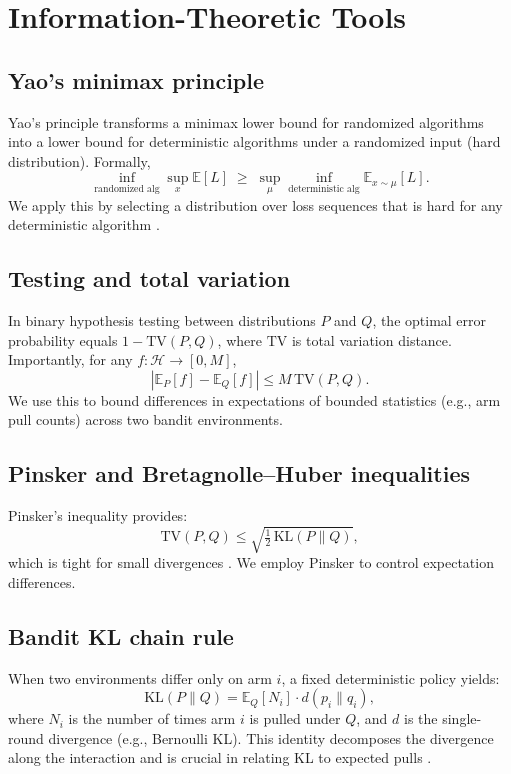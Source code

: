 \documentclass[10pt,twocolumn]{article}
\theoremstyle{definition}
\theoremstyle{remark}
\begin{document}
\section{Information-Theoretic Tools}
\label{sec:tools}

\subsection{Yao’s minimax principle}

Yao’s principle transforms a minimax lower bound for randomized algorithms into a lower bound for deterministic algorithms under a randomized input (hard distribution). Formally,
\[
  \inf_{\text{randomized alg}} \sup_{x} \mathbb{E}[L]
  \;\ge\;
  \sup_{\mu} \inf_{\text{deterministic alg}} \mathbb{E}_{x\sim\mu}[L].
\]
We apply this by selecting a distribution over loss sequences that is hard for any deterministic algorithm \citep[Chapter~14]{LS20}.

\subsection{Testing and total variation}

In binary hypothesis testing between distributions \(P\) and \(Q\), the optimal error probability equals \(1 - \mathrm{TV}(P,Q)\), where \(\mathrm{TV}\) is total variation distance. Importantly, for any \(f: \mathcal{H} \to [0,M]\),
\[
  |\mathbb{E}_P[f] - \mathbb{E}_Q[f]| \le M\,\mathrm{TV}(P,Q).
\]
We use this to bound differences in expectations of bounded statistics (e.g., arm pull counts) across two bandit environments.

\subsection{Pinsker and Bretagnolle–Huber inequalities}

Pinsker’s inequality provides:
\[
  \mathrm{TV}(P,Q) \le \sqrt{\tfrac12\,\mathrm{KL}(P\|Q)},
\]
which is tight for small divergences \citep{Canonne2022,PinskerInfoIneq}. We employ Pinsker to control expectation differences.

\subsection{Bandit KL chain rule}

When two environments differ only on arm \(i\), a fixed deterministic policy yields:
\[
  \mathrm{KL}(P \| Q)
  =
  \mathbb{E}_Q[N_i] \cdot d(p_i \| q_i),
\]
where \(N_i\) is the number of times arm \(i\) is pulled under \(Q\), and \(d\) is the single-round divergence (e.g., Bernoulli KL). This identity decomposes the divergence along the interaction and is crucial in relating KL to expected pulls \citep{LS20}.
\end{document}

